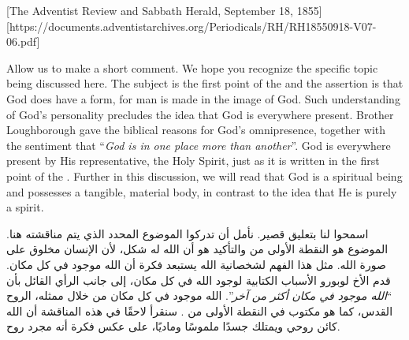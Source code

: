 [The Adventist Review and Sabbath Herald, September 18, 1855][https://documents.adventistarchives.org/Periodicals/RH/RH18550918-V07-06.pdf]


Allow us to make a short comment. We hope you recognize the specific topic being discussed here. The subject is the first point of the  and the assertion is that God does have a form, for man is made in the image of God. Such understanding of God’s personality precludes the idea that God is everywhere present. Brother Loughborough gave the biblical reasons for God's omnipresence, together with the sentiment that “\textit{God is in one place more than another}”. God is everywhere present by His representative, the Holy Spirit, just as it is written in the first point of the . Further in this discussion, we will read that God is a spiritual being and possesses a tangible, material body, in contrast to the idea that He is purely a spirit.


اسمحوا لنا بتعليق قصير. نأمل أن تدركوا الموضوع المحدد الذي يتم مناقشته هنا. الموضوع هو النقطة الأولى من  والتأكيد هو أن الله له شكل، لأن الإنسان مخلوق على صورة الله. مثل هذا الفهم لشخصانية الله يستبعد فكرة أن الله موجود في كل مكان. قدم الأخ لوبورو الأسباب الكتابية لوجود الله في كل مكان، إلى جانب الرأي القائل بأن “\textit{الله موجود في مكان أكثر من آخر}”. الله موجود في كل مكان من خلال ممثله، الروح القدس، كما هو مكتوب في النقطة الأولى من . سنقرأ لاحقًا في هذه المناقشة أن الله كائن روحي ويمتلك جسدًا ملموسًا وماديًا، على عكس فكرة أنه مجرد روح.


